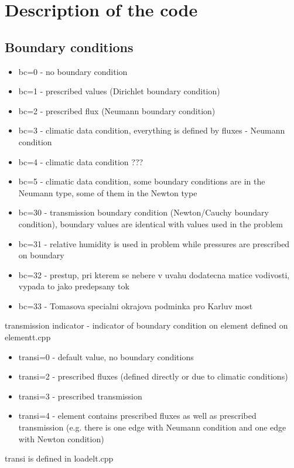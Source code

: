 \chapter{Description of the code}

\section{Boundary conditions}

\begin{itemize}
\item
bc=0 - no boundary condition
\item
bc=1 - prescribed values (Dirichlet boundary condition)
\item
bc=2 - prescribed flux (Neumann boundary condition)
\item
bc=3 - climatic data condition, everything is defined by fluxes - Neumann condition
\item
bc=4 - climatic data condition ???
\item
bc=5 - climatic data condition, some boundary conditions are in the Neumann type, some of them in the Newton type
\item
bc=30 - transmission boundary condition (Newton/Cauchy boundary condition),
boundary values are identical with values used in the problem
\item
bc=31 - relative humidity is used in problem while pressures are
prescribed on boundary
\item
bc=32 - prestup, pri kterem se nebere v uvahu dodatecna matice vodivosti,
vypada to jako predepsany tok
\item
bc=33 - Tomasova specialni okrajova podminka pro Karluv most
\end{itemize}

transmission indicator - indicator of boundary condition on element
defined on elementt.cpp
\begin{itemize}
\item
transi=0 - default value, no boundary conditions
\item
transi=2 - prescribed fluxes (defined directly or due to climatic conditions)
\item
transi=3 - prescribed transmission
\item
transi=4 - element contains prescribed fluxes as well as prescribed transmission (e.g. there is one edge with Neumann condition and one edge with Newton condition)
\end{itemize}
transi is defined in loadelt.cpp


